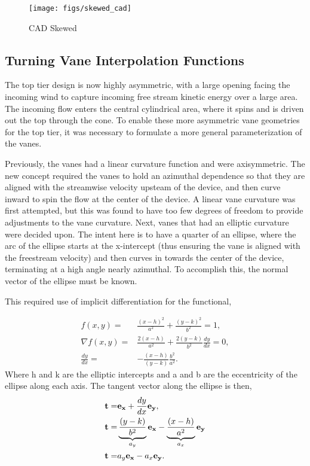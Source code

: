 \begin{figure}[!htb]
  \begin{center}
   \texttt{[image: figs/skewed\_cad]}
   \caption{CAD Skewed}
   \label{fig:cad_skewed}
  \end{center}
 \end{figure}

\subsection{Turning Vane Interpolation Functions}

The top tier design is now highly asymmetric, with a
large opening facing the incoming wind to capture incoming free stream
kinetic energy over a large area. The incoming flow enters the central
cylindrical area, where it spins and is driven out the top through the
cone. To enable these more asymmetric vane geometries for the top tier,
it was necessary to formulate a more general parameterization of the
vanes.

Previously, the vanes had a linear curvature function and were
axisymmetric. The new concept required the vanes to hold an azimuthal
dependence so that they are aligned with the streamwise velocity upsteam 
of the device, and then curve inward to spin the flow at the center of
the device. A linear vane curvature was first attempted, but this was
found to have too few degrees of freedom to provide adjustments to the
vane curvature. Next, vanes that had an elliptic curvature were decided
upon. The intent here is to have a quarter of an ellipse, where the arc
of the ellipse starts at the x-intercept (thus ensuring the vane is
aligned with the freestream velocity) and then curves in towards the
center of the device, terminating at a high angle nearly azimuthal. To
accomplish this, the normal vector of the ellipse must be known. 

This required use of implicit differentiation for the functional,

\begin{eqnarray}
 f(x,y)  =& \frac{(x-h)^2}{a^2} + \frac{(y-k)^2}{b^2} = 1, \\
 \nabla f(x,y) =& \frac{2 (x-h)}{a^2} + \frac{2 (y-k)}{b^2}\frac{dy}{dx} = 0, \\
 \frac{dy}{dx} =& -\frac{(x-h)}{(y-k)}\frac{b^2}{a^2}. 
\end{eqnarray}
Where h and k are the elliptic intercepts and a and b are the
eccentricity of the ellipse along each axis. The tangent vector along
the ellipse is then,  
\begin{eqnarray}
 {\bf t} =& {\bf e_x} + \frac{dy}{dx}{\bf e_y}, \\
 {\bf t} =& \underbrace{\frac{(y-k)}{b^2}}_{a_y} {\bf e_x} -
  \underbrace{\frac{(x-h)}{a^2}}_{a_x}{\bf e_y} \\
 {\bf t} =& {a_y} {\bf e_x} - {a_x}{\bf e_y}. 
\end{eqnarray}

